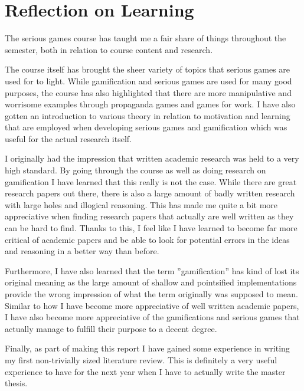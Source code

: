 \section{Reflection on Learning}
The serious games course has taught me a fair share of things throughout the semester, both in relation to course content and research. 

The course itself has brought the sheer variety of topics that serious games are used for to light. While gamification and serious games are used for many good purposes, the course has also highlighted that there are more manipulative and worrisome examples through propaganda games and games for work. I have also gotten an introduction to various theory in relation to motivation and learning that are employed when developing serious games and gamification which was useful for the actual research itself. 

I originally had the impression that written academic research was held to a very high standard. By going through the course as well as doing research on gamification I have learned that this really is not the case. While there are great research papers out there, there is also a large amount of badly written research with large holes and illogical reasoning. This has made me quite a bit more appreciative when finding research papers that actually are well written as they can be hard to find. Thanks to this, I feel like I have learned to become far more critical of academic papers and be able to look for potential errors in the ideas and reasoning in a better way than before. 

Furthermore, I have also learned that the term ''gamification'' has kind of lost its original meaning as the large amount of shallow and pointsified implementations provide the wrong impression of what the term originally was supposed to mean. Similar to how I have become more appreciative of well written academic papers, I have also become more appreciative of the gamifications and serious games that actually manage to fulfill their purpose to a decent degree. 

Finally, as part of making this report I have gained some experience in writing my first non-trivially sized literature review. This is definitely a very useful experience to have for the next year when I have to actually write the master thesis. 

